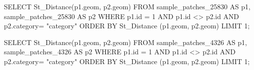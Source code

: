 \lstset{caption=Crear una función para calcular el IDW (I),label= IDW1}
\begin{SQL}
SELECT St_Distance(p1.geom, p2.geom) 
FROM sample_patches_25830 AS p1, sample_patches_25830 AS p2
WHERE p1.id = 1 AND p1.id <> p2.id AND p2.category= "category"
ORDER BY St_Distance (p1.geom, p2.geom)
LIMIT 1;

SELECT St_Distance(p1.geom, p2.geom) 
FROM sample_patches_4326 AS p1, sample_patches_4326 AS p2
WHERE p1.id = 1 AND p1.id <> p2.id AND p2.category= "category"
ORDER BY St_Distance (p1.geom, p2.geom)
LIMIT 1;
\end{SQL}
